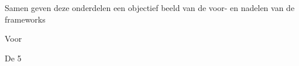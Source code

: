 
Samen geven deze onderdelen een objectief beeld van de voor- en nadelen van de frameworks

Voor 

De 5 

\lipsum[21-25]

